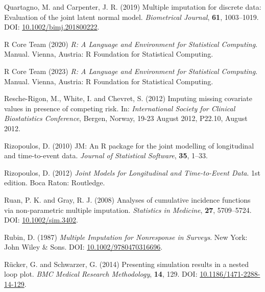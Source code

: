 \documentclass[
  letterpaper,
  DIV=11,
  numbers=noendperiod]{scrreprt}
\newlength{\cslhangindent}
\newlength{\cslentryspacingunit} %
\newenvironment{CSLReferences}[2] %
 {%
  \setlength{\parindent}{0pt}
  \ifodd #1
  \let\oldpar\par
  \def\par{\hangindent=\cslhangindent\oldpar}
  \fi
  \setlength{\parskip}{#2\cslentryspacingunit}
 }%
 {}
\begin{document}
\begin{CSLReferences}{1}{0}
\leavevmode{}%
Quartagno, M. and Carpenter, J. R. (2019) Multiple imputation for
discrete data: {Evaluation} of the joint latent normal model.
\emph{Biometrical Journal}, \textbf{61}, 1003--1019. DOI:
\href{https://doi.org/10.1002/bimj.201800222}{10.1002/bimj.201800222}.

\leavevmode{}%
R Core Team (2020) \emph{R: {A} Language and Environment for Statistical
Computing}. Manual. Vienna, Austria: R Foundation for Statistical
Computing.

\leavevmode{}%
R Core Team (2023) \emph{R: {A} Language and Environment for Statistical
Computing}. Manual. Vienna, Austria: R Foundation for Statistical
Computing.

\leavevmode{}%
Resche-Rigon, M., White, I. and Chevret, S. (2012) Imputing missing
covariate values in presence of competing risk. In: \emph{International
{Society} for {Clinical Biostatistics Conference}}, Bergen, Norway,
19-23 August 2012, P22.10, August 2012.

\leavevmode{}%
Rizopoulos, D. (2010) {JM}: {An R} package for the joint modelling of
longitudinal and time-to-event data. \emph{Journal of Statistical
Software}, \textbf{35}, 1--33.

\leavevmode{}%
Rizopoulos, D. (2012) \emph{Joint {Models} for {Longitudinal} and
{Time-to-Event Data}}. 1st edition. Boca Raton: Routledge.

\leavevmode{}%
Ruan, P. K. and Gray, R. J. (2008) Analyses of cumulative incidence
functions via non-parametric multiple imputation. \emph{Statistics in
Medicine}, \textbf{27}, 5709--5724. DOI:
\href{https://doi.org/10.1002/sim.3402}{10.1002/sim.3402}.

\leavevmode{}%
Rubin, D. (1987) \emph{Multiple Imputation for Nonresponse in Surveys}.
New York: John Wiley \& Sons. DOI:
\href{https://doi.org/10.1002/9780470316696}{10.1002/9780470316696}.

\leavevmode{}%
Rücker, G. and Schwarzer, G. (2014) Presenting simulation results in a
nested loop plot. \emph{BMC Medical Research Methodology}, \textbf{14},
129. DOI:
\href{https://doi.org/10.1186/1471-2288-14-129}{10.1186/1471-2288-14-129}.


\end{CSLReferences}
\end{document}
